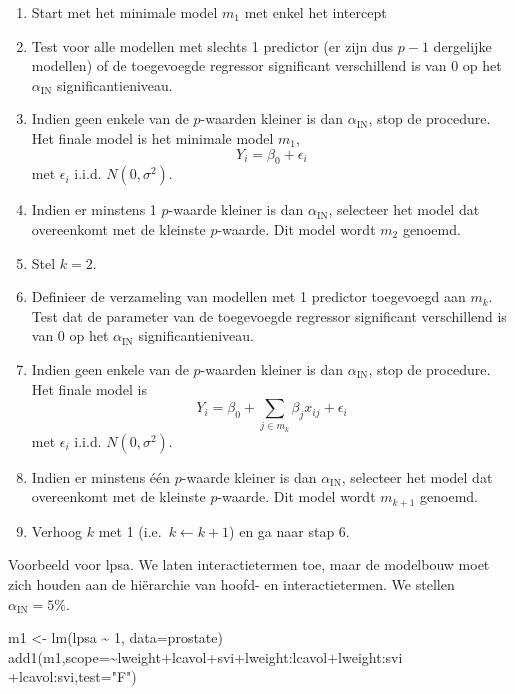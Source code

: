 \documentclass[
  dutch,
  letterpaper,
  12pt]{book}
\newenvironment{Shaded}{\begin{snugshade}}{\end{snugshade}}
\newcommand{\AttributeTok}[1]{\textcolor[rgb]{0.40,0.45,0.13}{#1}}
\newcommand{\DecValTok}[1]{\textcolor[rgb]{0.68,0.00,0.00}{#1}}
\newcommand{\FunctionTok}[1]{\textcolor[rgb]{0.28,0.35,0.67}{#1}}
\newcommand{\NormalTok}[1]{\textcolor[rgb]{0.00,0.23,0.31}{#1}}
\newcommand{\OtherTok}[1]{\textcolor[rgb]{0.00,0.23,0.31}{#1}}
\newcommand{\SpecialCharTok}[1]{\textcolor[rgb]{0.37,0.37,0.37}{#1}}
\newcommand{\StringTok}[1]{\textcolor[rgb]{0.13,0.47,0.30}{#1}}
\providecommand{\tightlist}{%
  \setlength{\itemsep}{0pt}\setlength{\parskip}{0pt}}
\theoremstyle{definition}
\theoremstyle{definition}
\theoremstyle{definition}
\theoremstyle{remark}
\begin{document}
\begin{enumerate}
\def\labelenumi{\arabic{enumi}.}
\tightlist
\item
  Start met het minimale model \(m_1\) met enkel het intercept
\item
  Test voor alle modellen met slechts 1 predictor (er zijn dus \(p-1\)
  dergelijke modellen) of de toegevoegde regressor significant
  verschillend is van 0 op het \(\alpha_{\text{IN}}\)
  significantieniveau.
\item
  Indien geen enkele van de \(p\)-waarden kleiner is dan
  \(\alpha_{\text{IN}}\), stop de procedure. Het finale model is het
  minimale model \(m_1\), \[
  Y_i = \beta_0 + \epsilon_i 
   \] met \(\epsilon_i \text{ i.i.d. } N(0,\sigma^2)\).
\item
  Indien er minstens 1 \(p\)-waarde kleiner is dan
  \(\alpha_{\text{IN}}\), selecteer het model dat overeenkomt met de
  kleinste \(p\)-waarde. Dit model wordt \(m_2\) genoemd.
\item
  Stel \(k=2\).
\item
  Definieer de verzameling van modellen met 1 predictor toegevoegd aan
  \(m_{k}\). Test dat de parameter van de toegevoegde regressor
  significant verschillend is van 0 op het \(\alpha_{\text{IN}}\)
  significantieniveau.
\item
  Indien geen enkele van de \(p\)-waarden kleiner is dan
  \(\alpha_{\text{IN}}\), stop de procedure. Het finale model is \[
  Y_i = \beta_0 + \sum_{j \in m_k} \beta_j x_{ij} + \epsilon_i 
   \] met \(\epsilon_i \text{ i.i.d. }  N(0,\sigma^2)\).
\item
  Indien er minstens één \(p\)-waarde kleiner is dan
  \(\alpha_{\text{IN}}\), selecteer het model dat overeenkomt met de
  kleinste \(p\)-waarde. Dit model wordt \(m_{k+1}\) genoemd.
\item
  Verhoog \(k\) met 1 (i.e.~\(k\leftarrow k+1\)) en ga naar stap 6.
\end{enumerate}

Voorbeeld voor lpsa. We laten interactietermen toe, maar de modelbouw
moet zich houden aan de hiërarchie van hoofd- en interactietermen. We
stellen \(\alpha_{\text{IN}}=5\%\).

\begin{Shaded}
\begin{Highlighting}[]
\NormalTok{m1 }\OtherTok{\textless{}{-}} \FunctionTok{lm}\NormalTok{(lpsa }\SpecialCharTok{\textasciitilde{}} \DecValTok{1}\NormalTok{, }\AttributeTok{data=}\NormalTok{prostate)}
\FunctionTok{add1}\NormalTok{(m1,}\AttributeTok{scope=}\SpecialCharTok{\textasciitilde{}}\NormalTok{lweight}\SpecialCharTok{+}\NormalTok{lcavol}\SpecialCharTok{+}\NormalTok{svi}\SpecialCharTok{+}\NormalTok{lweight}\SpecialCharTok{:}\NormalTok{lcavol}\SpecialCharTok{+}\NormalTok{lweight}\SpecialCharTok{:}\NormalTok{svi }\SpecialCharTok{+}\NormalTok{lcavol}\SpecialCharTok{:}\NormalTok{svi,}\AttributeTok{test=}\StringTok{"F"}\NormalTok{)}
\end{Highlighting}
\end{Shaded}
\end{document}

